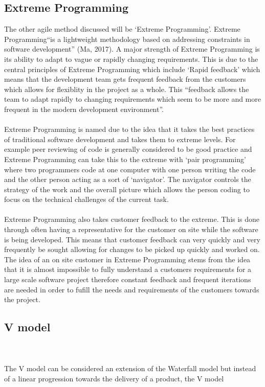 \documentclass{CRPITStyle}
\begin{document}
		\subsection{Extreme Programming}
		The other agile method discussed will be `Extreme Programming'. Extreme Programming``is a lightweight methodology based on addressing constraints in software development'' (Ma, 2017).  A major strength of Extreme Programming is its ability to adapt to vague or rapidly changing requirements. This is due to the central principles of Extreme Programming which include `Rapid
		feedback' which means that the development team gets frequent feedback from the customers which allows for flexiblity in the project as a whole. This ``feedback
		allows the team to adapt rapidly to changing requirements which seem to be more and more frequent in the modern development environment''.\\
		~\\
		Extreme Programming is named due to the idea that it takes the best practices of traditional software development and takes them to extreme levels. For example
		peer reviewing of code is generally considered to be good practice and Extreme Programming can take this to the extreme with `pair programming' where two programmers code at one computer with one person writing the code and the other person acting as a sort of `navigator'. The navigator controls the strategy of the work and the overall picture which allows the person coding to focus on the technical challenges of the current task.\\
		~\\
		Extreme Programming also takes customer feedback to the extreme. This is done through often having a representative for the customer on site while the software
		is being developed. This means that customer feedback can very quickly and very frequently be sought allowing for changes to be picked up quickly and worked on.
		The idea of an on site customer in Extreme Programming stems from the idea that it is almost impossible to fully understand a customers requirements for a large
		scale software project therefore constant feedback and frequent iterations are needed in order to fufill the needs and requirements of the customers towards the project.
		
		\subsection{V model}~\\
		\\
		The V model can be considered an extension of the Waterfall model but instead of a linear progression towards the delivery of a product, the V model
		
\end{document}
